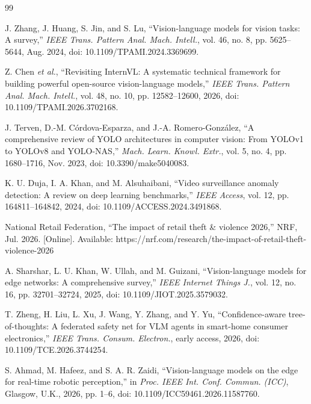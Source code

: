 \cleardoublepage
\renewcommand{\bibname}{DAFTAR PUSTAKA}

\begin{thebibliography}{99}

J. Zhang, J. Huang, S. Jin, and S. Lu, ``Vision-language models for vision tasks: A survey,'' \textit{IEEE Trans. Pattern Anal. Mach. Intell.}, vol. 46, no. 8, pp. 5625--5644, Aug. 2024, doi: 10.1109/TPAMI.2024.3369699.

Z. Chen \textit{et al.}, ``Revisiting InternVL: A systematic technical framework for building powerful open-source vision-language models,'' \textit{IEEE Trans. Pattern Anal. Mach. Intell.}, vol. 48, no. 10, pp. 12582--12600, 2026, doi: 10.1109/TPAMI.2026.3702168.

J. Terven, D.-M. Córdova-Esparza, and J.-A. Romero-González, ``A comprehensive review of YOLO architectures in computer vision: From YOLOv1 to YOLOv8 and YOLO-NAS,'' \textit{Mach. Learn. Knowl. Extr.}, vol. 5, no. 4, pp. 1680--1716, Nov. 2023, doi: 10.3390/make5040083.

K. U. Duja, I. A. Khan, and M. Alsuhaibani, ``Video surveillance anomaly detection: A review on deep learning benchmarks,'' \textit{IEEE Access}, vol. 12, pp. 164811--164842, 2024, doi: 10.1109/ACCESS.2024.3491868.

National Retail Federation, ``The impact of retail theft \& violence 2026,'' NRF, Jul. 2026. [Online]. Available: https://nrf.com/research/the-impact-of-retail-theft-violence-2026

A. Sharshar, L. U. Khan, W. Ullah, and M. Guizani, ``Vision-language models for edge networks: A comprehensive survey,'' \textit{IEEE Internet Things J.}, vol. 12, no. 16, pp. 32701--32724, 2025, doi: 10.1109/JIOT.2025.3579032.

T. Zheng, H. Liu, L. Xu, J. Wang, Y. Zhang, and Y. Yu, ``Confidence-aware tree-of-thoughts: A federated safety net for VLM agents in smart-home consumer electronics,'' \textit{IEEE Trans. Consum. Electron.}, early access, 2026, doi: 10.1109/TCE.2026.3744254.

S. Ahmad, M. Hafeez, and S. A. R. Zaidi, ``Vision-language models on the edge for real-time robotic perception,'' in \textit{Proc. IEEE Int. Conf. Commun. (ICC)}, Glasgow, U.K., 2026, pp. 1--6, doi: 10.1109/ICC59461.2026.11587760.


\end{thebibliography}
